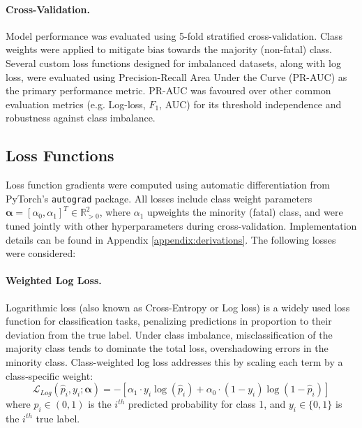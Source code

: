 \documentclass{article}
\begin{document}
\paragraph{Cross-Validation.}
Model performance was evaluated using 5-fold stratified cross-validation. Class weights were applied to mitigate bias towards the majority (non-fatal) class. Several custom loss functions designed for imbalanced datasets, along with log loss, were evaluated using Precision-Recall Area Under the Curve (PR-AUC) as the primary performance metric. PR-AUC was favoured over other common evaluation metrics (e.g. Log-loss, $F_1$, AUC) for its threshold independence and robustness against class imbalance.\cite{PR-AUC1, PR-AUC2}

\subsection{Loss Functions}
\label{subsec:loss}
Loss function gradients were computed using automatic differentiation from PyTorch's \texttt{autograd} package. All losses include class weight parameters $\boldsymbol{\alpha}=[\alpha_0, \alpha_1]^T \in \mathbb{R}^2_{>0}$, where $\alpha_1$ upweights the minority (fatal) class, and were tuned jointly with other hyperparameters during cross-validation. Implementation details can be found in Appendix \ref{appendix:derivations}. The following losses were considered:

\paragraph{Weighted Log Loss.}
Logarithmic loss (also known as Cross-Entropy or Log loss) is a widely used loss function for classification tasks, penalizing predictions in proportion to their deviation from the true label. Under class imbalance, misclassification of the majority class tends to dominate the total loss, overshadowing errors in the minority class.\cite{logloss1} Class-weighted log loss addresses this by scaling each term by a class-specific weight:\cite{logloss2, logloss3}
$$\mathcal{L}_{Log}(\hat p_i, y_i; \boldsymbol{\alpha})=-\left[\alpha_1\cdot y_i\log(\hat p_i) + \alpha_0 \cdot(1-y_i)\log(1-\hat p_i)\right]$$
where $\hat p_i\in(0,1)$ is the $i^{th}$ predicted probability for class 1, and $y_i\in\{0,1\}$ is the $i^{th}$ true label.
\end{document}
